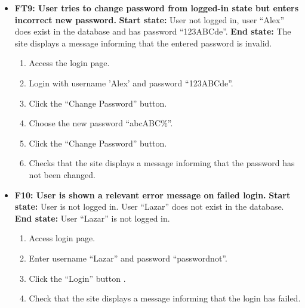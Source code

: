 \documentclass{article}
\begin{document}
\begin{itemize}
		\item \textbf {FT9: User tries to change password from logged-in state but enters incorrect new password.} \newline
		\textbf{Start state:} User not logged in, user “Alex” does exist in the database and has password “123ABCde”. \newline
		\textbf{End state:} The site displays a message informing that the entered password is invalid. 
		\begin{enumerate}
			\item Access the login page.
			\item Login with username ’Alex’ and password “123ABCde”.
			\item Click the “Change Password” button.
			\item Choose the new password “abcABC\%”.
			\item Click the “Change Password” button.
			\item Checks that the site displays a message informing that the password has not been changed.
		\end{enumerate}
		
		\item \textbf{F10: User is shown a relevant error message on failed login.} \newline
		\textbf{Start state:} User is not logged in. User “Lazar” does not exist in the database. \newline
		\textbf{End state:} User “Lazar” is not logged in.
		\begin{enumerate}
			\item Access login page.
			\item Enter username “Lazar” and password “passwordnot”.
			\item Click the “Login” button .
			\item Check that the site displays a message informing that the login has failed.
		\end{enumerate}
		
	\end{itemize}
	
\end{document}
